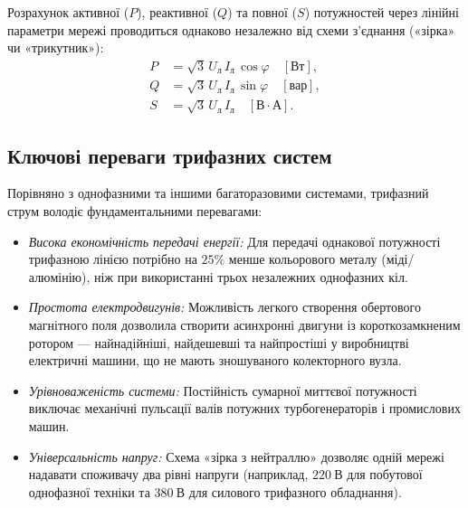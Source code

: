 \documentclass[]{ConspectBook}
\begin{document}
Розрахунок активної ($P$), реактивної ($Q$) та повної ($S$) потужностей через лінійні параметри мережі проводиться однаково незалежно від схеми з'єднання («зірка» чи «трикутник»):
\begin{align}
	P &= \sqrt{3} \, U_\text{л} \, I_\text{л} \, \cos\varphi \quad [\text{Вт}], \\
	Q &= \sqrt{3} \, U_\text{л} \, I_\text{л} \, \sin\varphi \quad [\text{вар}], \\
	S &= \sqrt{3} \, U_\text{л} \, I_\text{л} \quad [\text{В}\cdot\text{А}].
\end{align}

\subsection*{Ключові переваги трифазних систем}

Порівняно з однофазними та іншими багаторазовими системами, трифазний струм володіє фундаментальними перевагами:
\begin{itemize}
    \item \emph{Висока економічність передачі енергії:} Для передачі однакової потужності трифазною лінією потрібно на $25\%$ менше кольорового металу (міді/алюмінію), ніж при використанні трьох незалежних однофазних кіл.
    \item \emph{Простота електродвигунів:} Можливість легкого створення обертового магнітного поля дозволила створити асинхронні двигуни із короткозамкненим ротором --- найнадійніші, найдешевші та найпростіші у виробництві електричні машини, що не мають зношуваного колекторного вузла.
    \item \emph{Урівноваженість системи:} Постійність сумарної миттєвої потужності виключає механічні пульсації валів потужних турбогенераторів і промислових машин.
    \item \emph{Універсальність напруг:} Схема «зірка з нейтраллю» дозволяє одній мережі надавати споживачу два рівні напруги (наприклад, $220~\text{В}$ для побутової однофазної техніки та $380~\text{В}$ для силового трифазного обладнання).
\end{itemize}
\end{document}
